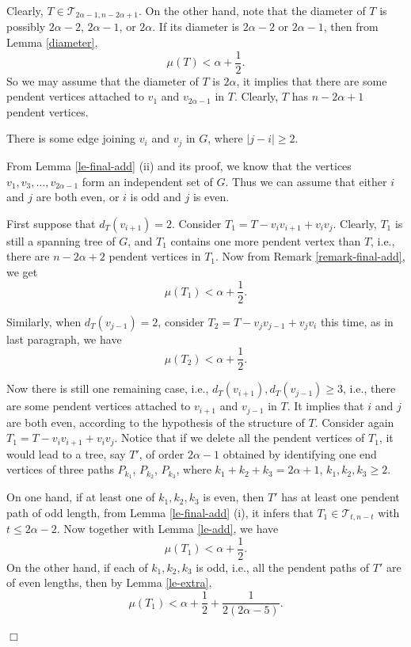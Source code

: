 \documentclass[10pt,a4paper]{amsart}
\newenvironment {Proof} {\noindent {\bf Proof.}}{\hspace*{\fill}$\Box$\par\vspace{4mm}}
\begin{document}
\begin{Proof}
Clearly, $T \in \mathcal{T}_{2\alpha-1,n - 2\alpha + 1}$.
On the other hand, note that the diameter of $T$ is possibly $2\alpha - 2$, $2\alpha - 1$, or $2\alpha$. If its diameter is $2\alpha - 2$ or $2\alpha - 1$, then
from Lemma \ref{diameter},
$$
\mu (T) < \alpha + \frac{1}{2}.
$$
So we may assume that the diameter of $T$ is $2\alpha$, it implies that there are some pendent vertices attached to $v_1$ and $v_{2\alpha-1}$ in $T$. Clearly, $T$ has $n - 2\alpha + 1$ pendent vertices.

 There is some edge joining $v_i$ and $v_j$ in $G$, where $|j - i| \ge 2$.


From Lemma \ref{le-final-add} (ii) and its proof, we know that the vertices $v_1, v_3, \dots, v_{2\alpha - 1}$ form an independent set of $G$. Thus we can assume that either $i$ and $j$ are both even, or $i$ is odd and $j$ is even.

First suppose that $d_T(v_{i+1}) = 2$. Consider $T_1 = T - v_i v_{i+1} + v_i v_j$. Clearly, $T_1$ is still a spanning tree of $G$, and $T_1$ contains one more pendent vertex than $T$, i.e., there are $n - 2\alpha + 2$ pendent vertices in $T_1$. Now from Remark \ref{remark-final-add}, we get
$$
\mu (T_1) < \alpha + \frac{1}{2}.
$$

Similarly, when $d_T(v_{j-1}) = 2$, consider $T_2 = T - v_j v_{j-1} + v_j v_i$ this time, as in last paragraph, we have
$$
\mu (T_2) < \alpha + \frac{1}{2}.
$$

Now there is still one remaining case, i.e., $d_T(v_{i+1}), d_T(v_{j-1}) \ge 3$, i.e., there are some pendent vertices attached to $v_{i+1}$ and $v_{j-1}$ in $T$. It implies that $i$ and $j$ are both even, according to the hypothesis of the structure of $T$. Consider again $T_1 = T - v_i v_{i+1} + v_i v_j$. Notice that if we delete all the pendent vertices of $T_1$, it would lead to a tree, say $T'$, of order $2\alpha-1$ obtained by identifying one end vertices of three paths $P_{k_1}$, $P_{k_2}$, $P_{k_3}$, where $k_1 + k_2 + k_3 = 2\alpha + 1$, $k_1, k_2, k_3 \ge 2$.



On one hand, if at least one of $k_1, k_2, k_3$ is even, then $T'$ has at least one pendent path of odd length, from Lemma \ref{le-final-add} (i), it infers that $T_1 \in \mathcal{T}_{t,n - t}$ with $t \le 2\alpha-2$. Now together with Lemma \ref{le-add},
we have
$$
\mu (T_1) < \alpha + \frac{1}{2}.
$$
On the other hand, if each of $k_1, k_2, k_3$ is odd, i.e., all the pendent paths of $T'$ are of even lengths, then by Lemma \ref{le-extra},
$$
\mu (T_1) < \alpha + \frac{1}{2} + \frac{1}{2(2\alpha-5)}.
$$




\end{Proof}
\end{document}
